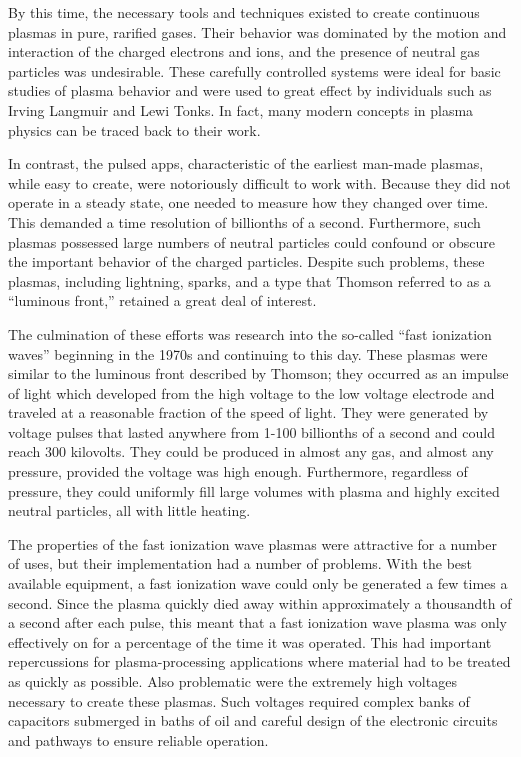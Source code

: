 By this time, the necessary tools and techniques existed to create continuous
plasmas in pure, rarified gases. Their behavior was dominated by the motion and
interaction of the charged electrons and ions, and the presence of neutral gas
particles was undesirable. These carefully controlled systems were ideal for basic
studies of plasma behavior and were used to great effect by individuals such as
Irving Langmuir and Lewi Tonks. In fact, many modern concepts in plasma physics
can be traced back to their work.

In contrast, the pulsed \acs{app}s, characteristic of the earliest man-made
plasmas, while easy to create, were notoriously difficult to work with. Because
they did not operate in a steady state, one needed to measure how they changed
over time. This demanded a time resolution of billionths of a second.
Furthermore, such plasmas possessed large numbers of neutral particles could
confound or obscure the important behavior of the charged particles. Despite
such problems, these plasmas, including lightning, sparks, and a type that
Thomson referred to as a ``luminous front,'' retained a great deal of interest.

The culmination of these efforts was research into the so-called ``fast
ionization waves'' beginning in the 1970s and continuing to this day. These
plasmas were similar to the luminous front described by Thomson; they occurred
as an impulse of light which developed from the high voltage to the low voltage
electrode and traveled at a reasonable fraction of the speed of light. They were
generated by voltage pulses that lasted anywhere from 1-100 billionths of a
second and could reach 300 kilovolts. They could be produced in almost any gas,
and almost any pressure, provided the voltage was high enough. Furthermore,
regardless of pressure, they could uniformly fill large volumes with plasma and
highly excited neutral particles, all with little heating.

The properties of the fast ionization wave plasmas were attractive for a number
of uses, but their implementation had a number of problems. With the best
available equipment, a fast ionization wave could only be generated a few times
a second. Since the plasma quickly died away within approximately a thousandth
of a second after each pulse, this meant that a fast ionization wave plasma was
only effectively on for a percentage of the time it was operated. This had
important repercussions for plasma-processing applications where material had to
be treated as quickly as possible. Also problematic were the extremely high
voltages necessary to create these plasmas. Such voltages required complex banks
of capacitors submerged in baths of oil and careful design of the electronic
circuits and pathways to ensure reliable operation.

